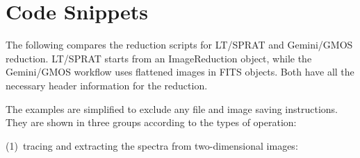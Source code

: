 \documentclass[linenumbers, twocolumn]{aastex631}
\begin{document}


\appendix
\section{Code Snippets}

The following compares the reduction scripts for LT/SPRAT and
Gemini/GMOS reduction. LT/SPRAT starts from an ImageReduction object,
while the Gemini/GMOS workflow uses flattened images in FITS objects.
Both have all the necessary header information for the reduction.

The examples are simplified to exclude any file and image saving
instructions. They are shown in three groups according to the types
of operation:

(1)~tracing and extracting the spectra from two-dimensional images:
\end{document}
